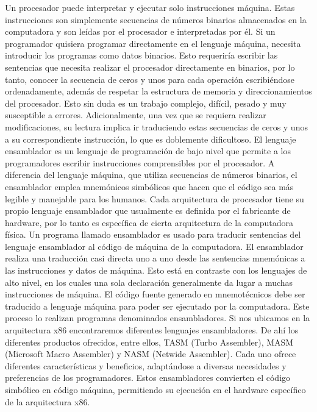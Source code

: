 \documentclass[12pt,twoside]{templates/unerthesis}
\begin{document}
Un procesador puede interpretar y ejecutar solo instrucciones máquina. Estas instrucciones son simplemente secuencias de números binarios almacenados en la computadora y son leídas por el procesador e interpretadas por él. Si un programador quisiera programar directamente en el lenguaje máquina, necesita introducir los programas como datos binarios. Esto requeriría escribir las sentencias que necesita realizar el procesador directamente en binarios, por lo tanto, conocer la secuencia de ceros y unos para cada operación escribiéndose ordenadamente, además de respetar la estructura de memoria y direccionamientos del procesador. Esto sin duda es un trabajo complejo, difícil, pesado y muy susceptible a errores. Adicionalmente, una vez que se requiera realizar modificaciones, su lectura implica ir traduciendo estas secuencias de ceros y unos a su correspondiente instrucción, lo que es doblemente dificultoso.
El lenguaje ensamblador es un lenguaje de programación de bajo nivel que permite a los programadores escribir instrucciones comprensibles por el procesador. A diferencia del lenguaje máquina, que utiliza secuencias de números binarios, el ensamblador emplea mnemónicos simbólicos que hacen que el código sea más legible y manejable para los humanos. Cada arquitectura de procesador tiene su propio lenguaje ensamblador que usualmente es definida por el fabricante de hardware, por lo tanto es específica de cierta arquitectura de la computadora física. Un programa llamado ensamblador es usado para traducir sentencias del lenguaje ensamblador al código de máquina de la computadora. El ensamblador realiza una traducción casi directa uno a uno desde las sentencias mnemónicas a las instrucciones y datos de máquina. Esto está en contraste con los lenguajes de alto nivel, en los cuales una sola declaración generalmente da lugar a muchas instrucciones de máquina.
El código fuente generado en mnemotécnicos debe ser traducido a lenguaje máquina para poder ser ejecutado por la computadora. Este proceso lo realizan programas denominados ensambladores. Si nos ubicamos en la arquitectura x86 encontraremos diferentes lenguajes ensambladores. De ahí los diferentes productos ofrecidos, entre ellos, TASM (Turbo Assembler), MASM (Microsoft Macro Assembler) y NASM (Netwide Assembler). Cada uno ofrece diferentes características y beneficios, adaptándose a diversas necesidades y preferencias de los programadores. Estos ensambladores convierten el código simbólico en código máquina, permitiendo su ejecución en el hardware específico de la arquitectura x86.
\end{document}
